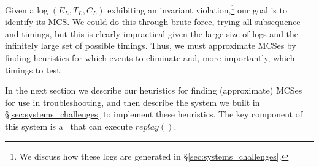 Given a log $(E_L, T_L, C_L)$ exhibiting an invariant violation,\footnote{We
discuss how these logs are generated in \S\ref{sec:systems_challenges}.}
our goal is to identify its MCS. We could do this through brute force, trying
all subsequence and timings, but this is clearly impractical given the large size of logs and the
infinitely large set of possible timings. Thus, we must approximate MCSes by finding heuristics
for which events to eliminate and, more importantly, which timings to test.

In the next section we describe our heuristics for finding (approximate) MCSes
for use in troubleshooting, and then
describe the system we built in \S\ref{sec:systems_challenges} to implement these heuristics.
The key component of this system is a \tester~that can execute $replay()$.
